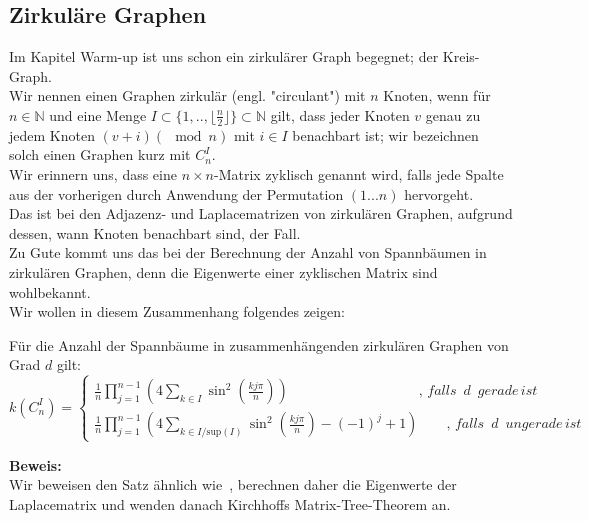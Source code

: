 \subsection{Zirkuläre Graphen}
Im Kapitel Warm-up ist uns schon ein zirkulärer Graph begegnet; der Kreis-Graph.\\
Wir nennen einen Graphen zirkulär (engl. "circulant") mit $n$ Knoten, wenn für $n \in \mathbb{N}$ und eine Menge $I \subset{\{1,..,\lfloor \frac{n}{2} \rfloor \}}\subset{\mathbb{N}}$ gilt, dass jeder Knoten $v$ genau zu jedem Knoten $(v+i) (\mod{n})$ mit $i \in I$ benachbart ist; wir bezeichnen solch einen Graphen kurz mit $C_n^I$.\\
Wir erinnern uns, dass eine $n\times n$-Matrix zyklisch genannt wird, falls jede Spalte aus der vorherigen durch Anwendung der Permutation $(1...n)$ hervorgeht.\\
Das ist bei den Adjazenz- und Laplacematrizen von zirkulären Graphen, aufgrund dessen, wann Knoten benachbart sind, der Fall.\\
Zu Gute kommt uns das bei der Berechnung der Anzahl von Spannbäumen in zirkulären Graphen, denn die Eigenwerte einer zyklischen Matrix sind wohlbekannt.\\
Wir wollen in diesem Zusammenhang folgendes zeigen:
\begin{Tms}
Für die Anzahl der Spannbäume in zusammenhängenden zirkulären Graphen von Grad $d$ gilt:\\
\begin{equation}
\mathit{k}\left( C_n^I \right) = 
 \begin{cases}
\frac{1}{n} \prod_{j=1}^{n-1} \left(4 \sum_{k \in I} \sin^2 \left( \frac{kj\pi}{n}\right) \right)\qquad\qquad\qquad\qquad\quad\; ,\,falls\,\,\,d\,\,\,gerade\,ist\\
\frac{1}{n} \prod_{j=1}^{n-1} \left(4 \sum_{k \in I/\mathrm{sup}(I)} \sin^2 \left( \frac{kj\pi}{n}\right)-(-1)^j+1\right)\qquad,\,falls\,\,\,d\,\,\,ungerade\,ist
\end{cases}
\end{equation}
\label{tmc}
\end{Tms}
\textbf{Beweis:}\\
Wir beweisen den Satz ähnlich wie~\cite{wang_yang_1984}, berechnen daher die Eigenwerte der Laplacematrix und wenden danach Kirchhoffs Matrix-Tree-Theorem an.\\

